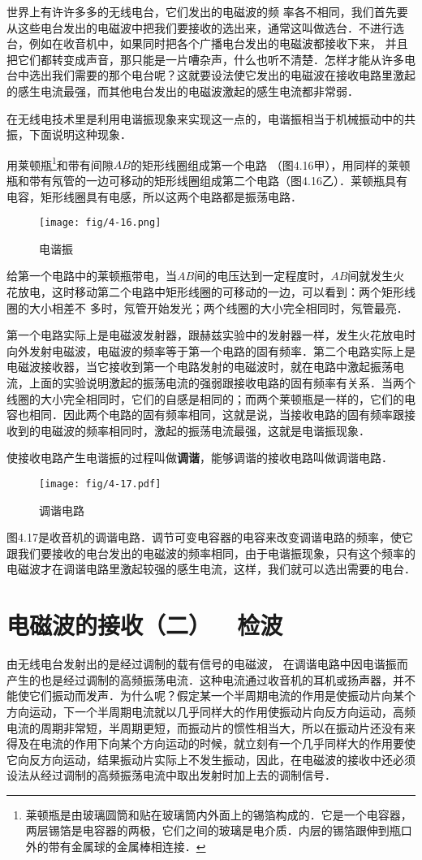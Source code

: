 世界上有许许多多的无线电台，它们发出的电磁波的频
率各不相同，我们首先要从这些电台发出的电磁波中把我们要接收的选出来，通常这叫做选台．不进行选台，例如在收音机中，如果同时把各个广播电台发出的电磁波都接收下来，
并且把它们都转变成声音，那只能是一片嘈杂声，什么也听不清楚．怎样才能从许多电台中选出我们需要的那个电台呢？这就要设法使它发出的电磁波在接收电路里激起的感生电流最强，而其他电台发出的电磁波激起的感生电流都非常弱．

在无线电技术里是利用电谐振现象来实现这一点的，电谐振相当于机械振动中的共振，下面说明这种现象．

用莱顿瓶\footnote{莱顿瓶是由玻璃圆筒和贴在玻璃筒内外面上的锡箔构成的．它是一个电容器，两层锡箔是电容器的两极，它们之间的玻璃是电介质．内层的锡箔跟伸到瓶口外的带有金属球的金属棒相连接．}和带有间隙$AB$的矩形线圈组成第一个电路
（图4.16甲），用同样的莱顿瓶和带有氖管的一边可移动的矩形线圈组成第二个电路（图4.16乙）．莱顿瓶具有电容，矩形线圈具有电感，所以这两个电路都是振荡电路．
\begin{figure}[htp]\centering
	\texttt{[image: fig/4-16.png]}
	\caption{电谐振}
	\end{figure}

给第一个电路中的莱顿瓶带电，当$AB$间的电压达到一定程度时，$AB$间就发生火花放电，这时移动第二个电路中矩形线圈的可移动的一边，可以看到：两个矩形线圈的大小相差不
多时，氖管开始发光；两个线圈的大小完全相同时，氖管最亮．

第一个电路实际上是电磁波发射器，跟赫兹实验中的发射器一样，发生火花放电时向外发射电磁波，电磁波的频率等于第一个电路的固有频率．第二个电路实际上是电磁波接收器，当它接收到第一个电路发射的电磁波时，就在电路中激起振荡电流，上面的实验说明激起的振荡电流的强弱跟接收电路的固有频率有关系．当两个线圈的大小完全相同时，它们的自感是相同的；而两个莱顿瓶是一样的，它们的电容也相同．因此两个电路的固有频率相同，这就是说，当接收电路的固有频率跟接收到的电磁波的频率相同时，激起的振荡电流最强，这就是电谐振现象．

使接收电路产生电谐振的过程叫做\textbf{调谐}，能够调谐的接收电路叫做调谐电路．
\begin{figure}[htp]\centering
	\texttt{[image: fig/4-17.pdf]}
	\caption{调谐电路}
	\end{figure}

图4.17是收音机的调谐电路．调节可变电容器的电容来改变调谐电路的频率，使它跟我们要接收的电台发出的电磁波的频率相同，由于电谐振现象，只有这个频率的电磁波才在调谐电路里激起较强的感生电流，这样，我们就可以选出需要的电台．

\section{电磁波的接收（二）~~检波}
由无线电台发射出的是经过调制的载有信号的电磁波，
在调谐电路中因电谐振而产生的也是经过调制的高频振荡电流．这种电流通过收音机的耳机或扬声器，并不能使它们振动而发声．为什么呢？假定某一个半周期电流的作用是使振动片向某个方向运动，下一个半周期电流就以几乎同样大的作用使振动片向反方向运动，高频电流的周期非常短，半周期更短，而振动片的惯性相当大，所以在振动片还没有来得及在电流的作用下向某个方向运动的时候，就立刻有一个几乎同样大的作用要使它向反方向运动，结果振动片实际上不发生振动，因此，在电磁波的接收中还必须设法从经过调制的高频振荡电流中取出发射时加上去的调制信号．

